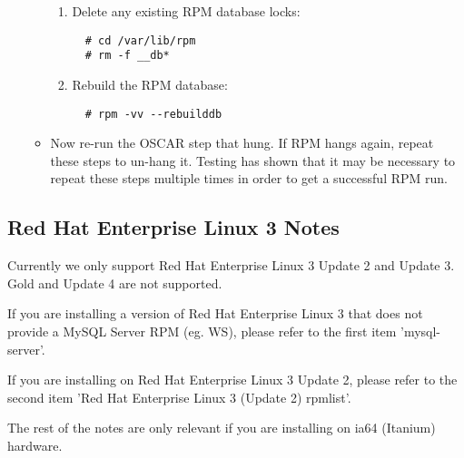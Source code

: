 \begin{itemize}
\begin{itemize}
\begin{enumerate}
                        \item Delete any existing RPM database locks:
\begin{verbatim}
  # cd /var/lib/rpm
  # rm -f __db*
\end{verbatim}

                        \item Rebuild the RPM database:
\begin{verbatim}
  # rpm -vv --rebuilddb
\end{verbatim}
                        \end{enumerate}

                      \item Now re-run the OSCAR step that hung.  If
                        RPM hangs again, repeat these steps to un-hang
                        it.  Testing has shown that it may be
                        necessary to repeat these steps multiple times
                        in order to get a successful RPM run.
        \end{itemize}

\end{itemize}


\subsection{Red Hat Enterprise Linux 3 Notes}
\label{subsec:rhel3notes}

Currently we only support Red Hat Enterprise Linux 3 Update 2 and Update
3.  Gold and Update 4 are not supported.

If you are installing a version of Red Hat Enterprise Linux 3 that does
not provide a MySQL Server RPM (eg. WS), please refer to the first item 'mysql-server'.

If you are installing on Red Hat Enterprise Linux 3 Update 2, please refer to
the second item 'Red Hat Enterprise Linux 3 (Update 2) rpmlist'.

The rest of the notes are only relevant if you are installing on ia64
(Itanium) hardware.

